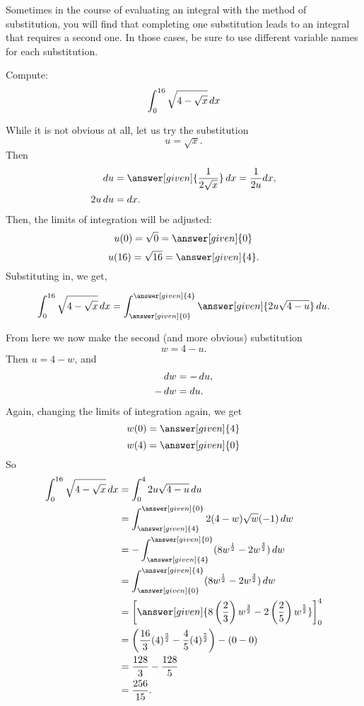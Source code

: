 \documentclass{ximera}
\begin{document}
 Sometimes in the course of evaluating an integral with the method of substitution, you will find that completing one substitution leads to an integral that requires a second one. In those cases, be sure to use different variable names for each substitution.
\begin{example}
Compute:
\[
\int_0^{16} \sqrt{4 - \sqrt{x}} \mathop{}\!d x
\]
\begin{explanation}
While it is not obvious at all, let us try the substitution
\[
u = \sqrt{x}.
\]
Then
\begin{align*}
\d u &= \answer[given]{\frac{1}{2 \sqrt{x}}} \d x=\frac{1}{2u}dx,\\
2u \d u &= \d x.
\end{align*}
Then, the limits of integration will be adjusted:
\[u(0)=\sqrt{0}=\answer[given]{0}\]
\[u(16)=\sqrt{16}=\answer[given]{4}.\]
Substituting in, we get,

\[\int_0^{16} \sqrt{4 - \sqrt{x}} \d x =\int_{\answer[given]{0}}^{\answer[given]{4}} \answer[given]{2u \sqrt{4-u}} \d u.\]

From here we now make the second (and more obvious) substitution
\[
w = 4-u.
\]
Then $u = 4-w$, and
\begin{align*}
\mathop{}\!d w &= - \mathop{}\!d u,\\
-\mathop{}\!d w &=  \mathop{}\!d u.
\end{align*}
Again, changing the limits of integration again, we get
\[w(0)=\answer[given]{4}\]
\[w(4)=\answer[given]{0}\]
So
\begin{align*}
\int_0^{16} \sqrt{4 - \sqrt{x}} \d x &= \int_0^4 2u \sqrt{4-u} \d u  \\
&= \int_{\answer[given]{4}}^{\answer[given]{0}} 2 (4-w) \sqrt{w} (-1) \d w  \\
&= - \int_{\answer[given]{4}}^{\answer[given]{0}} ( 8w^{\frac{1}{2}} - 2w^{\frac{3}{2}} ) \d w  \\
&= \int_{\answer[given]{0}}^{\answer[given]{4}} ( 8w^{\frac{1}{2}} - 2w^{\frac{3}{2}} ) \d w  \\
&= \eval{ \answer[given]{8 \left( \frac{2}{3} \right) w^{\frac{3}{2}} - 2 \left( \frac{2}{5} \right) w^{\frac{5}{2}}} }_{0}^{4}  \\
&= \left( \frac{16}{3} (4)^{\frac{3}{2}} - \frac{4}{5} (4)^{\frac{5}{2}} \right) - \left( 0 - 0 \right)  \\
&= \frac{128}{3} - \frac{128}{5}   \\
&= \frac{256}{15}.
\end{align*}
\end{explanation}
\end{example}
\end{document}
